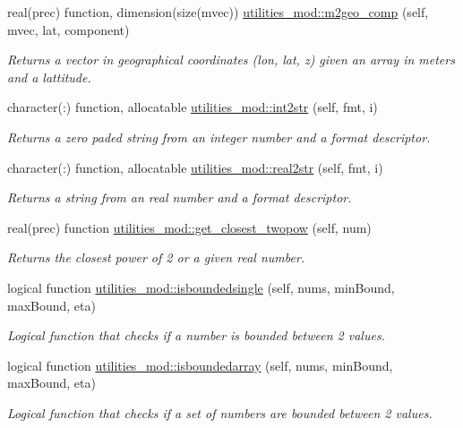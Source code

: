 \begin{DoxyCompactItemize}
real(prec) function, dimension(size(mvec)) \mbox{\hyperlink{namespaceutilities__mod_ae6b8a45b229e3f1f8c2b12dd74e7a2dd}{utilities\+\_\+mod\+::m2geo\+\_\+comp}} (self, mvec, lat, component)
\begin{DoxyCompactList}\small\item\em Returns a vector in geographical coordinates (lon, lat, z) given an array in meters and a lattitude. \end{DoxyCompactList}\item 
character(\+:) function, allocatable \mbox{\hyperlink{namespaceutilities__mod_a6ba00b0a503f26c7e755d1efbbe83c5b}{utilities\+\_\+mod\+::int2str}} (self, fmt, i)
\begin{DoxyCompactList}\small\item\em Returns a zero paded string from an integer number and a format descriptor. \end{DoxyCompactList}\item 
character(\+:) function, allocatable \mbox{\hyperlink{namespaceutilities__mod_a2c8481f2b9f4cddf8391bd1e8b624335}{utilities\+\_\+mod\+::real2str}} (self, fmt, i)
\begin{DoxyCompactList}\small\item\em Returns a string from an real number and a format descriptor. \end{DoxyCompactList}\item 
real(prec) function \mbox{\hyperlink{namespaceutilities__mod_a164054d89c012d95f63c12a6cc0ac8d7}{utilities\+\_\+mod\+::get\+\_\+closest\+\_\+twopow}} (self, num)
\begin{DoxyCompactList}\small\item\em Returns the closest power of 2 or a given real number. \end{DoxyCompactList}\item 
logical function \mbox{\hyperlink{namespaceutilities__mod_a258d85bcc477041275bd954667168ea3}{utilities\+\_\+mod\+::isboundedsingle}} (self, nums, min\+Bound, max\+Bound, eta)
\begin{DoxyCompactList}\small\item\em Logical function that checks if a number is bounded between 2 values. \end{DoxyCompactList}\item 
logical function \mbox{\hyperlink{namespaceutilities__mod_a1d16eada2f4cb344ad1500b3edba43fa}{utilities\+\_\+mod\+::isboundedarray}} (self, nums, min\+Bound, max\+Bound, eta)
\begin{DoxyCompactList}\small\item\em Logical function that checks if a set of numbers are bounded between 2 values. \end{DoxyCompactList}\item 

\end{DoxyCompactItemize}
